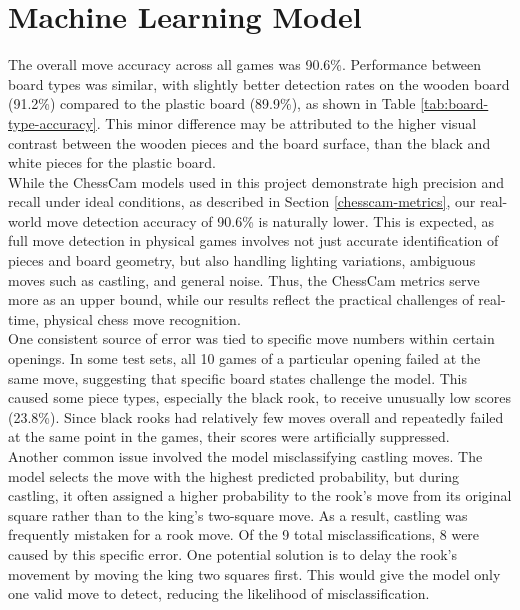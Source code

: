 \section{Machine Learning Model}

The overall move accuracy across all games was 90.6\%. Performance between board types was similar, with slightly better detection rates on the wooden board (91.2\%) compared to the plastic board (89.9\%), as shown in Table \ref{tab:board-type-accuracy}. This minor difference may be attributed to the higher visual contrast between the wooden pieces and the board surface, than the black and white pieces for the plastic board. \\

While the ChessCam models used in this project demonstrate high precision and recall under ideal conditions, as described in Section \ref{chesscam-metrics}, our real-world move detection accuracy of 90.6\% is naturally lower. This is expected, as full move detection in physical games involves not just accurate identification of pieces and board geometry, but also handling lighting variations, ambiguous moves such as \gls{castling}, and general noise. Thus, the ChessCam metrics serve more as an upper bound, while our results reflect the practical challenges of real-time, physical chess move recognition. \\

One consistent source of error was tied to specific move numbers within certain openings. In some test sets, all 10 games of a particular opening failed at the same move, suggesting that specific board states challenge the model. This caused some piece types, especially the black rook, to receive unusually low scores (23.8\%). Since black rooks had relatively few moves overall and repeatedly failed at the same point in the games, their scores were artificially suppressed. \\

Another common issue involved the model misclassifying \gls{castling} moves. The model selects the move with the highest predicted probability, but during \gls{castling}, it often assigned a higher probability to the rook’s move from its original square rather than to the king’s two-square move. As a result, \gls{castling} was frequently mistaken for a rook move. Of the 9 total misclassifications, 8 were caused by this specific error. One potential solution is to delay the rook’s movement by moving the king two squares first. This would give the model only one valid move to detect, reducing the likelihood of misclassification. \\

